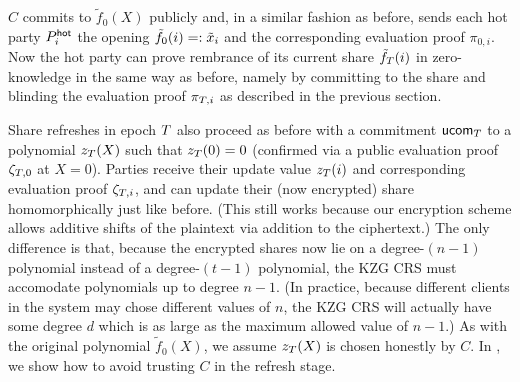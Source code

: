 $C$ commits to $\tilde{f}_0(X)$ publicly and, in a similar fashion as before, sends each hot party $P_i^{\mathsf{hot}}$ the opening $\tilde{f}_0(i) =: \tilde{x}_i$ and the corresponding evaluation proof $\pi_{0,i}$. Now the hot party can prove rembrance of its current share $\tilde{f}_{T}(i)$ in zero-knowledge in the same way as before, namely by committing to the share and blinding the evaluation proof $\pi_{T,i}$ as described in the previous section.

Share refreshes in epoch $T$ also proceed as before with a commitment $\mathsf{ucom}_{T}$ to a polynomial $z_{T}(X)$ such that $z_{T}(0) = 0$ (confirmed via a public evaluation proof $\zeta_{T,0}$ at $X=0$). Parties receive their update value $z_{T}(i)$ and corresponding evaluation proof $\zeta_{T,i}$, and can update their (now encrypted) share homomorphically just like before. (This still works because our encryption scheme allows additive shifts of the plaintext via addition to the ciphertext.) The only difference is that, because the encrypted shares now lie on a degree-$(n-1)$ polynomial instead of a degree-$(t-1)$ polynomial, the KZG CRS must accomodate polynomials up to degree $n-1$. (In practice, because different clients in the system may chose different values of $n$, the KZG CRS will actually have some degree $d$ which is as large as the maximum allowed value of $n-1$.) As with the original polynomial $\tilde{f}_0(X)$, we assume $z_{T}(X)$ is chosen honestly by $C$. In , we show how to avoid trusting $C$ in the refresh stage.

